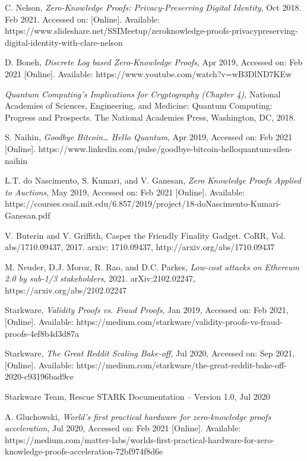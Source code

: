 \documentclass[peerreview]{ieeesyscoin}
\begin{document}
\begin{thebibliography}{00}
 C. Nelson, \textit{Zero-Knowledge Proofs: Privacy-Preserving Digital Identity}, Oct 2018. Feb 2021. Accessed on: [Online]. Available: https://www.slideshare.net/SSIMeetup/zeroknowledge-proofs-privacypreserving-digital-identity-with-clare-nelson

 D. Boneh, \textit{Discrete Log based Zero-Knowledge Proofs}, Apr 2019,  Accessed on: Feb 2021 [Online].  Available: https://www.youtube.com/watch?v=wB3DlND7KEw

 \textit{Quantum Computing’s Implications for Cryptography (Chapter 4)}, National Academies of Sciences, Engineering, and Medicine: Quantum Computing: Progress and Prospects. The National Academies Press, Washington, DC, 2018.

 S. Naihin, \textit{Goodbye Bitcoin… Hello Quantum}, Apr 2019, Accessed on: Feb 2021 [Online].   https://www.linkedin.com/pulse/goodbye-bitcoin-helloquantum-silen-naihin

 L.T. do Nascimento, S. Kumari, and V. Ganesan, \textit{Zero Knowledge Proofs Applied to Auctions}, May 2019, Accessed on: Feb 2021 [Online].   Available: https://courses.csail.mit.edu/6.857/2019/project/18-doNascimento-Kumari-Ganesan.pdf

 V. Buterin and V. Griffith, Casper the Friendly Finality Gadget. CoRR, Vol. abs/1710.09437, 2017. arxiv: 1710.09437, http://arxiv.org/abs/1710.09437

 M. Neuder, D.J. Moroz, R. Rao, and D.C. Parkes, \textit{Low-cost attacks on Ethereum 2.0 by sub-1/3 stakeholders}, 2021. arXiv:2102.02247,  https://arxiv.org/abs/2102.02247

 Starkware, \textit{Validity Proofs vs. Fraud Proofs}, Jan 2019, Accessed on: Feb 2021, [Online]. Available: https://medium.com/starkware/validity-proofs-vs-fraud-proofs-4ef8b4d3d87a

 Starkware, \textit{The Great Reddit Scaling Bake-off}, Jul 2020, Accessed on: Sep 2021, [Online]. Available: https://medium.com/starkware/the-great-reddit-bake-off-2020-c93196bad9ce

  Starkware Team, Rescue STARK Documentation – Version 1.0, Jul 2020

 A. Gluchowski, \textit{World’s first practical hardware for zero-knowledge proofs acceleration}, Jul 2020, Accessed on: Feb 2021 [Online]. Available:  https://medium.com/matter-labs/worlds-first-practical-hardware-for-zero-knowledge-proofs-acceleration-72bf974f8d6e


\end{thebibliography}
\end{document}
